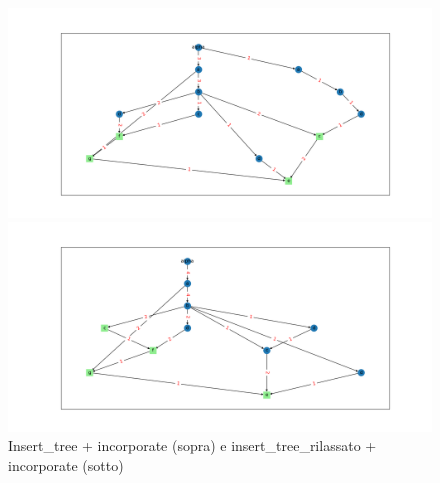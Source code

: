\documentclass{article}
\begin{document}
\begin{figure}[H]
    \centering
    \includegraphics[max width=\linewidth, max height=0.9\textheight, keepaspectratio]{Resources/Uguaglianza+incorporate.png}
    
    \includegraphics[max width=\linewidth, max height=0.9\textheight, keepaspectratio]{Resources/insert_tree_rilassato+incorporate.png}
    \caption{Insert\_tree + incorporate (sopra) e insert\_tree\_rilassato + incorporate (sotto)}
    \label{fig:esempio3}
\end{figure}
\end{document}
